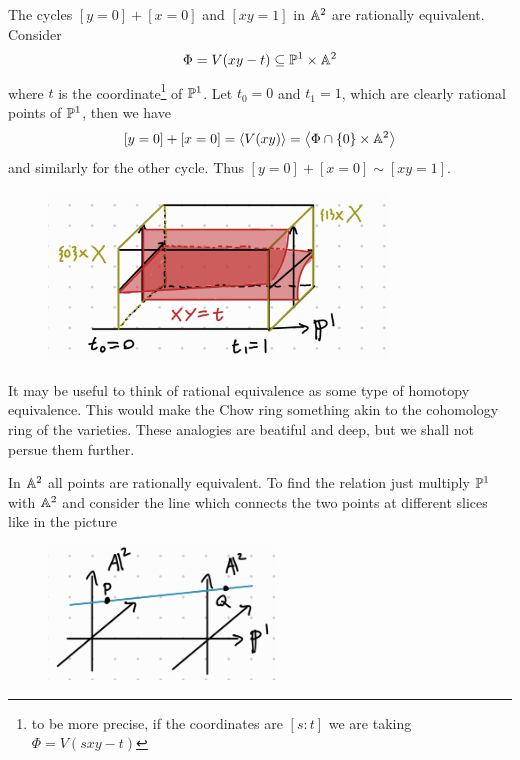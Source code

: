 \begin{example}
The cycles $[y=0]+[x=0]$ and $[xy=1]$ in $\mathbb{A}^2$ are rationally equivalent. Consider 
\[\Phi=V(xy-t)\subseteq \mathbb{P}^1\times \mathbb{A}^2\]
where $t$ is the coordinate\footnote{to be more precise, if the coordinates are $[s:t]$ we are taking $\Phi=V(sxy-t)$} of $\mathbb{P}^1$. Let $t_0=0$ and $t_1=1$, which are clearly rational points of $\mathbb{P}^1$, then we have
\[[y=0]+[x=0]=\left\langle {V(xy)}\right\rangle=\left\langle {\Phi\cap \left\{{0}\right\}\times \mathbb{A}^2}\right\rangle\]
and similarly for the other cycle. Thus $[y=0]+[x=0]\sim [xy=1]$.
\begin{figure}[!htb]
	\centering
	\includegraphics[width=9cm]{Images/rational-equivalence.png}
\end{figure}
\end{example}

\begin{remark}
It may be useful to think of rational equivalence as some type of homotopy equivalence. This would make the Chow ring something akin to the cohomology ring of the varieties. These analogies are beatiful and deep, but we shall not persue them further.
\end{remark}



\begin{example}
In $\mathbb{A}^2$ all points are rationally equivalent. To find the relation just multiply $\mathbb{P}^1$ with $\mathbb{A}^2$ and consider the line which connects the two points at different slices like in the picture
\begin{figure}[!htb]
	\centering
	\includegraphics[width=6cm]{Images/points-in-A2-are-rationally-equivalent.png}
\end{figure}
\end{example}


